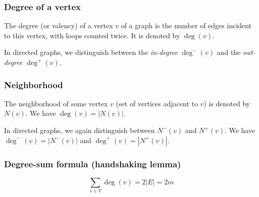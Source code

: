 \documentclass[a4paper]{article}
\begin{document}
\subsubsection{Degree of a vertex}
The degree (or valency) of a vertex $v$ of a graph is the number of edges incident to this vertex, with loops counted twice. It is denoted by $\deg(v)$.

In directed graphs, we distinguish between the \textit{in-degree} $\deg^-(v)$ and the \textit{out-degree} $\deg^+(v)$.

\subsubsection{Neighborhood}
The neighborhood of some vertex $v$ (set of vertices adjacent to $v$) is denoted by $N(v)$. We have $\deg\left(v\right)=\left\lvert N\left(v\right) \right\rvert$.

In directed graphs, we again distinguish between $N^-\left(v\right)$ and $N^+\left(v\right)$. We have $\deg^-(v)=|N^-(v)|$ and $\deg^+(v)=|N^+(v)|$.

\subsubsection{Degree-sum formula (handshaking lemma)}
$$\sum_{v\in V} \deg(v)=2|E|=2m$$


\newpage
\end{document}
